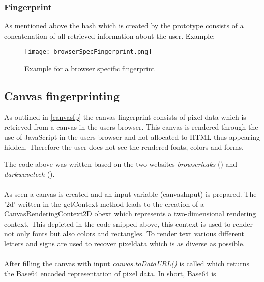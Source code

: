 \subsubsection{Fingerprint}
As mentioned above the hash which is created by the prototype consists of a concatenation of all retrieved information about the user.
Example:
\begin{figure}[H]
	\centering
	\texttt{[image: browserSpecFingerprint.png]}
	\caption{Example for a browser specific fingerprint\\}
	\label{fig:specFP}
\end{figure}

\subsection{Canvas fingerprinting} \label{sec:codeCanvas}

As outlined in \autoref{canvasfp} the canvas fingerprint consists of pixel data which is retrieved from a canvas in the users browser. This canvas is rendered through the use of JavaScript in the users browser and not allocated to HTML thus appearing hidden. Therefore the user does not see the rendered fonts, colors and forms.\\

The code above was written based on the two websites \textit{browserleaks} (\textcite{browserleaks}) and \textit{darkwavetech} (\textcite{jkula17}).\\\\
As seen a canvas is created and an input variable (canvasInput) is prepared. The '2d' written in the getContext method leads to the creation of a CanvasRenderingContext2D obext which represents a two-dimensional rendering context. This depicted in the code snipped above, this context is used to render not only fonts but also colors and rectangles. To render text various different letters and signs are used to recover pixeldata which is as diverse as possible.\\\\
After filling the canvas with input \textit{canvas.toDataURL()} is called which returns the Base64 encoded representation of pixel data. In short, Base64 is 

